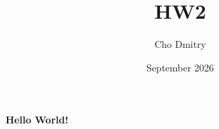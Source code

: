 \documentclass{article}
\title{HW2}
\author{Cho Dmitry}
\date{September 2026}
\begin{document}
\maketitle

\textbf{Hello World!}
\end{document}
